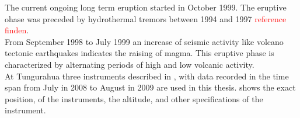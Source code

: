 \documentclass  [
  paper    = a4,
  BCOR     = 10mm,
  twoside,
  fontsize = 12pt,
  fleqn,
  toc      = bibnumbered,
  toc      = listofnumbered,
  numbers  = noendperiod,
  headings = normal,
  listof   = leveldown,
  version  = 3.03
]                                       {scrreprt}
\begin{document}
	The current ongoing long term eruption started in October 1999. The eruptive ohase was preceded by hydrothermal tremors between 1994 and 1997 \citep{samaniego}\textcolor{red}{reference finden}.\\
	From September 1998 to July 1999 an increase of seismic activity like volcano tectonic earthquakes indicates the raising of magma. This eruptive phase is characterized by alternating periods of high and low volcanic activity. \\

	At Tungurahua three instruments described  in , with data recorded in the time span from July in 2008 to August in 2009 are used in this thesis.
	 shows the exact position, of the instruments, the altitude, and other specifications of the instrument. \\
\end{document}
